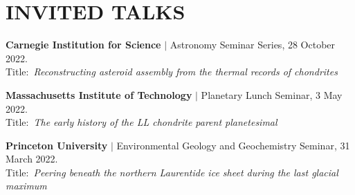 \section*{INVITED TALKS}

\begin{etaremune} [itemsep=4pt, leftmargin=3ex]

   \item \textbf{Carnegie Institution for Science} $|$
   Astronomy Seminar Series, 28 October 2022. \\
  Title:~\textit{Reconstructing asteroid assembly from the thermal records of chondrites}

   \item \textbf{Massachusetts Institute of Technology} $|$
   Planetary Lunch Seminar, 3 May 2022. \\
  Title:~\textit{The early history of the LL chondrite parent planetesimal}

  \item \textbf{Princeton University} $|$ 
  Environmental Geology and Geochemistry Seminar, 31 March 2022. \\
  Title:~\textit{Peering beneath the northern Laurentide ice sheet during the last glacial maximum}
  
\end{etaremune}